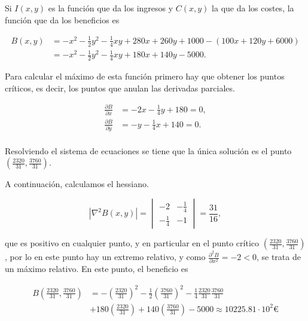 \documentclass[
  spanish,
  a4paper,
]{scrreport}
\theoremstyle{definition}
\theoremstyle{remark}
\begin{document}
\begin{tcolorbox}[enhanced jigsaw, arc=.35mm, bottomrule=.15mm, bottomtitle=1mm, breakable, colback=white, colbacktitle=quarto-callout-tip-color!10!white, colframe=quarto-callout-tip-color-frame, coltitle=black, left=2mm, leftrule=.75mm, opacityback=0, opacitybacktitle=0.6, rightrule=.15mm, title=\textcolor{quarto-callout-tip-color}{\faLightbulb}\hspace{0.5em}{Solución}, titlerule=0mm, toprule=.15mm, toptitle=1mm]

Si \(I(x,y)\) es la función que da los ingresos y \(C(x,y)\) la que da
los costes, la función que da los beneficios es

\begin{align*}
B(x,y) 
&= -x^2 - \frac{1}{2}y^2 - \frac{1}{4}xy + 280x + 260y + 1000 - (100x + 120y + 6000) \\
&= -x^2 - \frac{1}{2}y^2 - \frac{1}{4}xy + 180x + 140y - 5000.
\end{align*}

Para calcular el máximo de esta función primero hay que obtener los
puntos críticos, es decir, los puntos que anulan las derivadas
parciales.

\begin{align*}
\frac{\partial B}{\partial x} 
&= -2x -\frac{1}{4}y + 180 = 0,\\
\frac{\partial B}{\partial y} 
&= -y -\frac{1}{4}x + 140 = 0.\\
\end{align*}

Resolviendo el sistema de ecuaciones se tiene que la única solución es
el punto \(\left(\frac{2320}{31}, \frac{3760}{31}\right)\).

A continuación, calculamos el hessiano.

\[
|\nabla^2 B(x,y)| =
\begin{vmatrix}
-2 & -\frac{1}{4}\\
-\frac{1}{4} & -1
\end{vmatrix}
= \frac{31}{16},
\]

que es positivo en cualquier punto, y en particular en el punto crítico
\(\left(\frac{2320}{31}, \frac{3760}{31}\right)\), por lo en este punto
hay un extremo relativo, y como
\(\frac{\partial^2 B}{\partial x^2} = -2<0\), se trata de un máximo
relativo. En este punto, el beneficio es

\begin{align*}
B\left(\frac{2320}{31}, \frac{3760}{31}\right) 
&= -\left(\frac{2320}{31}\right)^2 - \frac{1}{2}\left(\frac{3760}{31}\right)^2 - \frac{1}{4}\frac{2320}{31}\frac{3760}{31}  \\
&+ 180 \left(\frac{2320}{31}\right) + 140\left(\frac{3760}{31}\right) - 5000
\approx 10225.81\cdot 10^2 \mbox{€}
\end{align*}


\end{tcolorbox}
\end{document}
